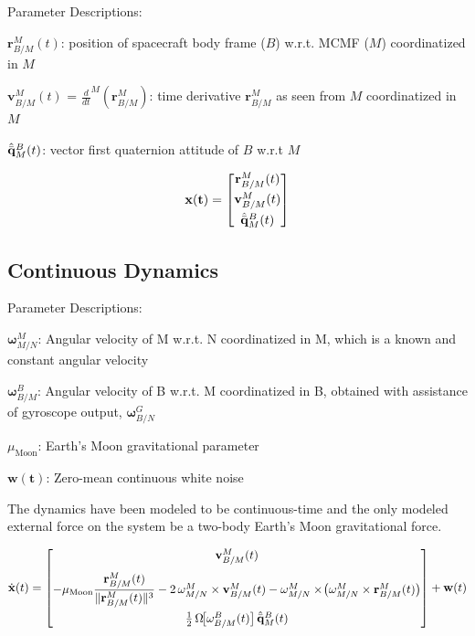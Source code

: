 \documentclass[conf]{new-aiaa}
\newcommand{\vect}[1]{\mathbf{#1}}
\newcommand{\rBM}{\vect{r}^M_{B/M}}      %
\newcommand{\vBM}{\vect{v}^M_{B/M}}      %
\newcommand{\qBM}{\hat{\Bar{\mathbf{q}}}^B_{M}}    %
\newcommand{\wMN}{\vect{\omega}^M_{M/N}}
\newcommand{\wBM}{\vect{\omega}^B_{B/M}}
\newcommand{\wGryoOut}{\vect{\omega}^G_{B/N}}
\begin{document}
Parameter Descriptions:


$\rBM(t)$: position of spacecraft body frame ($B$) w.r.t. MCMF ($M$) coordinatized in $M$


$\vBM(t)$ = $\frac{d}{dt}^M(\rBM)$: time derivative $\rBM$ as seen from $M$ coordinatized in $M$


$\qBM(t)$: vector first quaternion attitude of $B$ w.r.t $M$

\begin{equation}
\vect{x(t)} =
\begin{bmatrix}
\rBM(t) \\[4pt]
\vBM(t) \\[4pt]
\qBM(t)
\end{bmatrix}
\label{eq:StateDef}
\end{equation}





\subsection{Continuous Dynamics}
Parameter Descriptions:

$\wMN$: Angular velocity of M w.r.t. N coordinatized in M, which is a known and constant angular velocity

$\wBM$: Angular velocity of B w.r.t. M coordinatized in B, obtained with assistance of gyroscope output, $\wGryoOut$

$\mu_{\mathrm{Moon}}$: Earth's Moon gravitational parameter

$\vect{w(t)}$: Zero-mean continuous white noise



\vspace{10pt}
The dynamics have been modeled to be continuous-time and the only modeled external force on the system be a two-body Earth's Moon gravitational force.





\begin{equation}
\dot{\vect{x}}(t) =
\begin{bmatrix}
\vBM(t) \\[8pt]
-\mu_{\mathrm{Moon}} \dfrac{\rBM(t)}{\|\rBM(t)\|^3}
- 2\,\wMN \times \vBM(t)
- \wMN \times \!\big( \wMN \times \rBM(t) \big) \\[12pt]
\tfrac{1}{2}\,\Omega\!\big[\wBM(t)\big]\,\qBM(t)
\end{bmatrix}
+ \vect{w}(t)
\label{eq:StateDynamicsModel}
\end{equation}
\end{document}
